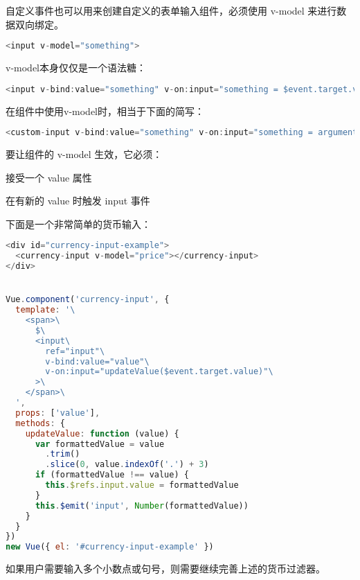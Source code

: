 自定义事件也可以用来创建自定义的表单输入组件，必须使用 v-model 来进行数据双向绑定。


\begin{lstlisting}[language=JavaScript]
<input v-model="something">
\end{lstlisting}

v-model本身仅仅是一个语法糖：

\begin{lstlisting}[language=JavaScript]
<input v-bind:value="something" v-on:input="something = $event.target.value">
\end{lstlisting}

在组件中使用v-model时，相当于下面的简写：

\begin{lstlisting}[language=JavaScript]
<custom-input v-bind:value="something" v-on:input="something = arguments[0]"></custom-input>
\end{lstlisting}

要让组件的 v-model 生效，它必须：

\begin{compactitem}
\item 接受一个 value 属性
\item 在有新的 value 时触发 input 事件
\end{compactitem}

下面是一个非常简单的货币输入：

\begin{lstlisting}[language=JavaScript]
<div id="currency-input-example">
  <currency-input v-model="price"></currency-input>
</div>


Vue.component('currency-input', {
  template: '\
    <span>\
      $\
      <input\
        ref="input"\
        v-bind:value="value"\
        v-on:input="updateValue($event.target.value)"\
      >\
    </span>\
  ',
  props: ['value'],
  methods: {
    updateValue: function (value) {
      var formattedValue = value
        .trim()
        .slice(0, value.indexOf('.') + 3)
      if (formattedValue !== value) {
        this.$refs.input.value = formattedValue
      }
      this.$emit('input', Number(formattedValue))
    }
  }
})
new Vue({ el: '#currency-input-example' })
\end{lstlisting}


如果用户需要输入多个小数点或句号，则需要继续完善上述的货币过滤器。


